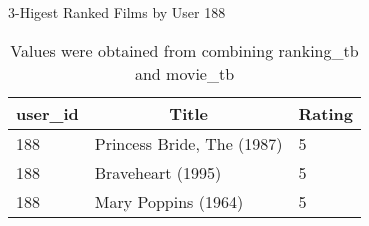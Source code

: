 \begin{table}[!htbp]
	\caption{3-Higest Ranked Films by User 188} \label{tab:higest-188}
	\begin{center}
	\vspace{-5mm}
		\begin{tabular}{ l l l }
			\hline
			\multicolumn{1}{c}{user\_id} & \multicolumn{1}{c}{Title} & \multicolumn{1}{c}{Rating}\\
			\hline
     		188 & Princess Bride, The (1987)  &      5\\
     		188 & Braveheart (1995)           &      5\\
     		188 & Mary Poppins (1964)         &      5\\
			\hline
		\end{tabular}
	\caption*{\scriptsize Values were obtained from combining ranking\_tb and movie\_tb}
	 \end{center}
\end{table}